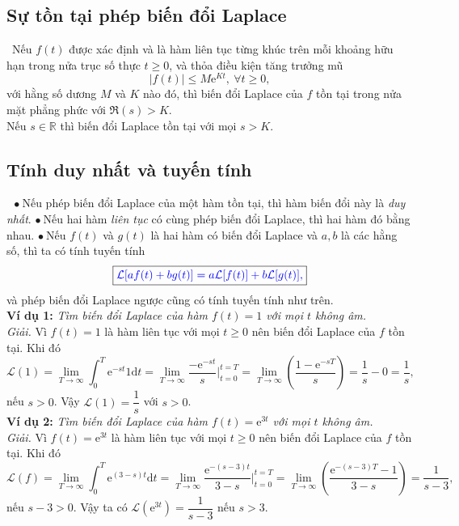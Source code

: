 \documentclass[10pt, a4paper]{article}
\begin{document}
	\subsection{Sự tồn tại phép biến đổi Laplace}
	\quad\,\,\,Nếu $f(t)$ được xác định và là hàm liên tục từng khúc trên mỗi khoảng hữu hạn trong nửa trục số thực $t\ge0$, và thỏa điều kiện tăng trưởng mũ $$|f(t)|\le M\mathrm e^{Kt},~\forall t\ge0,$$
	với hằng số dương $M$ và $K$ nào đó, thì biến đổi Laplace của $f$ tồn tại trong nửa mặt phẳng phức với $\mathfrak R(s)>K$.\\
	
	Nếu $s\in\mathbb R$ thì biến đổi Laplace tồn tại với mọi $s>K$.
	\subsection{Tính duy nhất và tuyến tính}
	\quad~\,$\bullet~$Nếu phép biến đổi Laplace của một hàm tồn tại, thì hàm biến đổi này là \textit{duy nhất}.
	\vskip7pt
	$\bullet~$Nếu hai hàm \textit{liên tục} có cùng phép biến đổi Laplace, thì hai hàm đó bằng nhau.
	\vskip7pt
	$\bullet~$Nếu $f(t)$ và $g(t)$ là hai hàm có biến đổi Laplace và $a,b$ là các hằng số, thì ta có tính tuyến tính
	$$\boxed{\color{blue}\mathcal L[af(t)+bg(t)]=a\mathcal L[f(t)]+b\mathcal L[g(t)],}$$
	và phép biến đổi Laplace ngược cũng có tính tuyến tính như trên.\\
	
	\textbf{Ví dụ 1:} \textit{Tìm biến đổi Laplace của hàm $f(t)=1$ với mọi $t$ không âm.}\\
	
	\textit{Giải.} Vì $f(t)=1$ là hàm liên tục với mọi $t\ge0$ nên biến đổi Laplace của $f$ tồn tại. Khi đó $$\mathcal L(1)=\lim_{T\to\infty}\int_0^T\mathrm e^{-st}1\mathrm dt=\lim_{T\to\infty}\dfrac{-\mathrm e^{-st}}{s}\Bigg|_{t=0}^{t=T}=\lim_{T\to\infty}\left(\frac{1-\mathrm e^{-sT}}{s}\right)=\frac1s-0=\frac1s,$$
	nếu $s>0$. Vậy $\mathcal L(1)=\dfrac1s$ với $s>0$.\\
	
	\textbf{Ví dụ 2:} \textit{Tìm biến đổi Laplace của hàm $f(t)=\mathrm e^{3t}$ với mọi $t$ không âm.}\\
	
	\textit{Giải.} Vì $f(t)=\mathrm e^{3t}$ là hàm liên tục với mọi $t\ge0$ nên biến đổi Laplace của $f$ tồn tại. Khi đó $$\mathcal L(f)=\lim_{T\to\infty}\int_0^T\mathrm e^{(3-s)t}\mathrm dt=\lim_{T\to\infty}\dfrac{\mathrm e^{-(s-3)t}}{3-s}\Bigg|_{t=0}^{t=T}=\lim_{T\to\infty}\left(\frac{\mathrm e^{-(s-3)T}-1}{3-s}\right)=\frac1{s-3},$$
	nếu $s-3>0$. Vậy ta có $\mathcal L(\mathrm e^{3t})=\dfrac{1}{s-3}$ nếu $s>3$.\\
	
\end{document}
